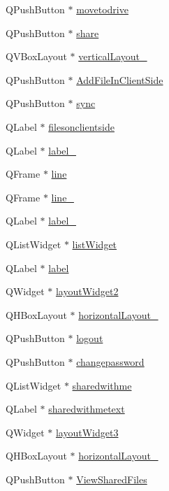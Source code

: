 \begin{DoxyCompactItemize}
\item 
Q\-Push\-Button $\ast$ \hyperlink{classUi__file_a93ae9cae947a030e0ed9404f5f4a7938}{movetodrive}
\item 
Q\-Push\-Button $\ast$ \hyperlink{classUi__file_a23567f8ea0399a181557f33505f2ed5a}{share}
\item 
Q\-V\-Box\-Layout $\ast$ \hyperlink{classUi__file_a6730299fe89ba0081c7727c27a231532}{vertical\-Layout\-\_}
\item 
Q\-Push\-Button $\ast$ \hyperlink{classUi__file_a96e98cf341e50b713c96e9a4503d4890}{Add\-File\-In\-Client\-Side}
\item 
Q\-Push\-Button $\ast$ \hyperlink{classUi__file_ad4f6ba5c98f89e071b42aea3247ffe58}{sync}
\item 
Q\-Label $\ast$ \hyperlink{classUi__file_ad2f4b79165dbb124ba2ff6e1f941975e}{filesonclientside}
\item 
Q\-Label $\ast$ \hyperlink{classUi__file_ab164b9d8a9dc6ded9bf0e8513a4a79e9}{label\-\_}
\item 
Q\-Frame $\ast$ \hyperlink{classUi__file_af74828e9e8b9231eeb55891be3fc59a1}{line}
\item 
Q\-Frame $\ast$ \hyperlink{classUi__file_ac1105d716d96ceaadc60854f85366946}{line\-\_}
\item 
Q\-Label $\ast$ \hyperlink{classUi__file_a76e6c67ba5c7a35809fc27fcd84c4a2d}{label\-\_}
\item 
Q\-List\-Widget $\ast$ \hyperlink{classUi__file_aaf74077524ed42f2e90a1c8dea56b51b}{list\-Widget}
\item 
Q\-Label $\ast$ \hyperlink{classUi__file_a179e5306f23c3cb3951f6bf3fd2ab6ea}{label}
\item 
Q\-Widget $\ast$ \hyperlink{classUi__file_a572464c9d1ba504e9186f61a50ce8423}{layout\-Widget2}
\item 
Q\-H\-Box\-Layout $\ast$ \hyperlink{classUi__file_abe4eb4f4fb8cc2600678f4b95eb4a038}{horizontal\-Layout\-\_}
\item 
Q\-Push\-Button $\ast$ \hyperlink{classUi__file_ac02ede20e8a299c42208622de3d8625f}{logout}
\item 
Q\-Push\-Button $\ast$ \hyperlink{classUi__file_abd1f4e427dbb45b93faa49d7019687db}{changepassword}
\item 
Q\-List\-Widget $\ast$ \hyperlink{classUi__file_ae748cfb04620ff69980a6886d25e33f7}{sharedwithme}
\item 
Q\-Label $\ast$ \hyperlink{classUi__file_a088870d19a1bf09da6548e8f6987ce99}{sharedwithmetext}
\item 
Q\-Widget $\ast$ \hyperlink{classUi__file_a002b7d8bd04d984f1c503b32a8cacd10}{layout\-Widget3}
\item 
Q\-H\-Box\-Layout $\ast$ \hyperlink{classUi__file_a2b17ff0563f5ef520624a032b393dd9d}{horizontal\-Layout\-\_}
\item 
Q\-Push\-Button $\ast$ \hyperlink{classUi__file_a13d0359dc69280547f741813c8ab521c}{View\-Shared\-Files}
\end{DoxyCompactItemize}


